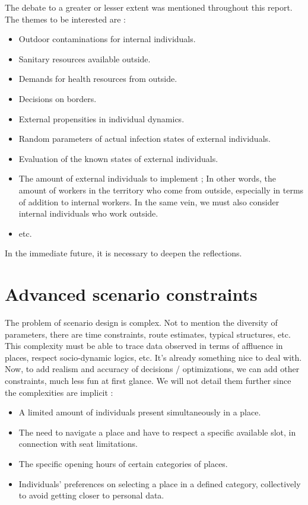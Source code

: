 The debate to a greater or lesser extent was mentioned throughout this report. The themes to be interested are :\\
\begin{itemize}
\item Outdoor contaminations for internal individuals.
\item Sanitary resources available outside.
\item Demands for health resources from outside.
\item Decisions on borders.
\item External propensities in individual dynamics.
\item Random parameters of actual infection states of external individuals.
\item Evaluation of the known states of external individuals.
\item The amount of external individuals to implement ; In other words, the amount of workers in the territory who come from outside, especially in terms of addition to internal workers. In the same vein, we must also consider internal individuals who work outside.
\item etc.\\
\end{itemize}

In the immediate future, it is necessary to deepen the reflections.\\

\newpage

\section{Advanced scenario constraints}

The problem of scenario design is complex. Not to mention the diversity of parameters, there are time constraints, route estimates, typical structures, etc. This complexity must be able to trace data observed in terms of affluence in places, respect socio-dynamic logics, etc. It's already something nice to deal with.\\

Now, to add realism and accuracy of decisions / optimizations, we can add other constraints, much less fun at first glance. We will not detail them further since the complexities are implicit :\\
\begin{itemize}
\item A limited amount of individuals present simultaneously in a place.
\item The need to navigate a place and have to respect a specific available slot, in connection with seat limitations.
\item The specific opening hours of certain categories of places.
\item Individuals' preferences on selecting a place in a defined category, collectively to avoid getting closer to personal data.\\
\end{itemize}

